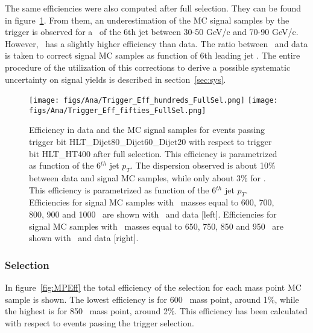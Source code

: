 The same efficiencies were also computed after full selection. They can be found in figure~\ref{fig:TrigEffPostMH}. From them, an underestimation of the MC signal samples by the trigger is observed for a \pt~of the 6th jet between 30-50 GeV/c and 70-90 GeV/c. However, \ttbar~has a slightly higher efficiency than data. The ratio between \ttbar~and data is taken to correct signal MC samples as function of 6th leading jet \pt. The entire procedure of the utilization of this corrections to derive a possible systematic uncertainty on signal yields is described in section~\ref{sec:sys}. %

\begin{figure}[!Hhtbp]
  \begin{center}
    \texttt{[image: figs/Ana/Trigger\_Eff\_hundreds\_FullSel.png]}
    \texttt{[image: figs/Ana/Trigger\_Eff\_fifties\_FullSel.png]}
    \caption{Efficiency in data and the MC signal samples for events passing trigger bit HLT\_Dijet80\_Dijet60\_Dijet20 with respect to trigger bit HLT\_HT400 after full selection. This efficiency is parametrized as function of the 6$^{th}$ jet $p_{T}$. The dispersion observed is about 10\% between data and signal MC samples, while only about 3\%  for \ttbar. This efficiency is parametrized as function of the 6$^{th}$ jet $p_{T}$. Efficiencies for signal MC samples with \Tp~masses equal to 600, 700, 800, 900 and 1000 \GeVcc~are shown with \ttbar~and data [left]. Efficiencies for signal MC samples with \Tp~masses equal to 650, 750, 850 and 950 \GeVcc~are shown with \ttbar~and data [right].}
    \label{fig:TrigEffPostMH}
  \end{center}
\end{figure}

\subsubsection{Selection}
\label{sec:seleff}

In figure~\ref{fig:MPEff} the total efficiency of the selection for each mass point MC sample is shown. The lowest efficiency is for 600 \GeVcc~mass point, around 1\%, while the highest is for 850 \GeVcc~mass point, around 2\%. This efficiency has been calculated with respect to events passing the trigger selection.  

